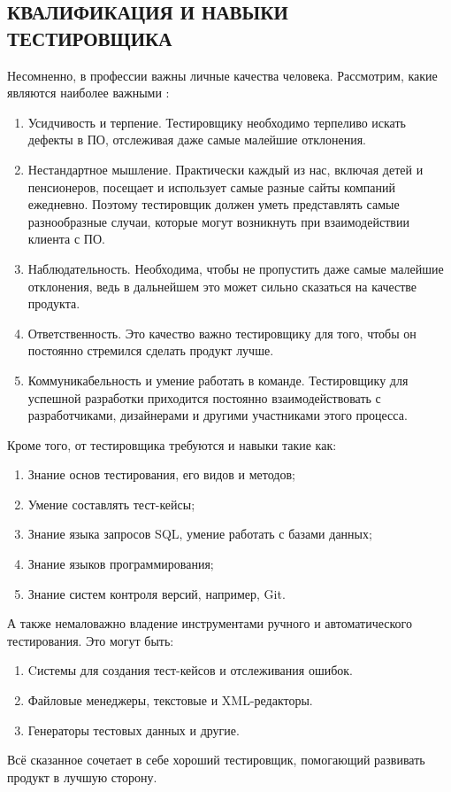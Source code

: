 \subsection{КВАЛИФИКАЦИЯ И НАВЫКИ ТЕСТИРОВЩИКА}
Несомненно, в профессии важны личные качества человека. Рассмотрим, какие 
являются наиболее важными \cite{SoftSkills}:
\begin{enumerate}
    \item Усидчивость и терпение. Тестировщику необходимо терпеливо искать 
    дефекты в ПО, отслеживая даже самые малейшие отклонения.
    \item Нестандартное мышление. Практически каждый из нас, включая детей и 
    пенсионеров, посещает и использует самые разные сайты компаний ежедневно. 
    Поэтому тестировщик должен уметь представлять самые разнообразные случаи, 
    которые могут возникнуть при взаимодействии клиента с ПО.
    \item Наблюдательность. Необходима, чтобы не пропустить даже самые 
    малейшие отклонения, ведь в дальнейшем это может сильно сказаться на 
    качестве продукта.
    \item Ответственность. Это качество важно тестировщику для того, чтобы он 
    постоянно стремился сделать продукт лучше.
    \item Коммуникабельность и умение работать в команде. Тестировщику для 
    успешной разработки приходится постоянно взаимодействовать с разработчиками, 
    дизайнерами и другими участниками этого процесса.
\end{enumerate}
Кроме того, от тестировщика требуются и навыки такие как:
\begin{enumerate}
    \item Знание основ тестирования, его видов и методов;
    \item Умение составлять тест-кейсы;
    \item Знание языка запросов SQL, умение работать с базами данных;
    \item Знание языков программирования;
    \item Знание систем контроля версий, например, Git.
\end{enumerate}
А также немаловажно владение инструментами ручного и автоматического 
тестирования. Это могут быть:
\begin{enumerate}
    \item Cистемы для создания тест-кейсов и отслеживания ошибок.
    \item Файловые менеджеры, текстовые и XML-редакторы.
    \item Генераторы тестовых данных и другие.
\end{enumerate}
Всё сказанное сочетает в себе хороший тестировщик, помогающий развивать продукт 
в лучшую сторону.
